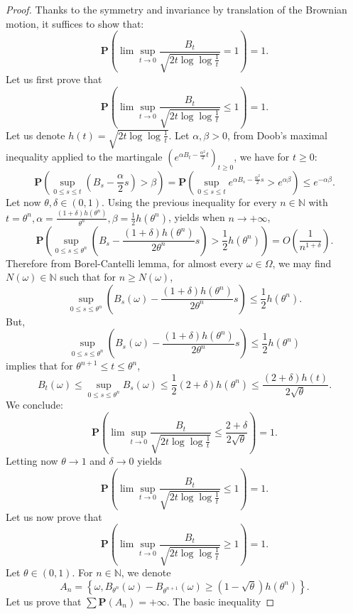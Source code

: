 \documentclass[twoside, 12pt]{book}
\numberwithin{equation}{chapter}
\def\bP{{\mathbf P}}
\def\ge{\geqslant}
\def\le{\leqslant}
\begin{document}
	\begin{proof}
		Thanks to the symmetry and invariance by translation of the Brownian motion, it suffices to show that:
		$$
		\bP \left( \lim \sup_{t \rightarrow 0} \frac{B_{t}}{\sqrt{2t\log  \log  \frac{1}{t}}} =1 \right)=1.  
		$$
		Let us first prove that 
		$$
		\bP \left( \lim \sup_{t \rightarrow 0} \frac{B_{t}}{\sqrt{2t \log  \log  \frac{1}{t}}} \le 1 \right)=1.  
		$$
		Let us denote $h(t)=\sqrt{2t \log  \log  \frac{1}{t}}$.   Let $\alpha, \beta >0$, from Doob’s maximal inequality applied to the martingale $\left(e^{\alpha B_t-\frac{\alpha^2}{2}t} \right)_{t \ge 0}$, we have for $t \ge 0$:
		\[
		\bP  \left(  \sup_{0 \le s \le t} \left( B_s-\frac{\alpha}{2}s\right)>\beta \right)=\bP  \left(  \sup_{0 \le s \le t} e^{\alpha B_s -\frac{\alpha^2}{2}s} >e^{\alpha \beta}\right) \le e^{-\alpha \beta}.
		\]
		Let now $\theta , \delta \in (0,1)$. Using the previous inequality for every $n \in \mathbb{N}$ with $t=\theta^n, \alpha=\frac{(1+\delta)h(\theta^n)}{\theta^n}, \beta=\frac{1}{2} h (\theta^n)$,  yields when $n \rightarrow +\infty$,
		$$
		\bP  \left(  \sup_{0 \le s \le \theta^n} \left( B_s -\frac{(1+\delta)h(\theta^n)}{2\theta^n}s\right)>\frac{1}{2} h (\theta^n) \right)=O\left( \frac{1}{n^{1+\delta}} \right).  
		$$
		Therefore from Borel-Cantelli lemma, for almost every $\omega \in \Omega$, we may find $N(\omega)\in \mathbb{N}$ such that for $n \ge N(\omega)$,
		$$
		\sup_{0 \le s \le \theta^n} \left( B_s(\omega)-\frac{(1+\delta)h(\theta^n)}{2\theta^n} s\right) \le \frac{1}{2}h (\theta^n).  
		$$
		But,
		$$
		\sup_{0 \le s \le \theta^n} \left( B_s(\omega) -\frac{(1+\delta)h(\theta^n)}{2\theta^n} s\right) \le \frac{1}{2} h (\theta^n)  
		$$
		implies that for $\theta^{n+1} \le t\le \theta^n$,
		$$
		B_t (\omega) \le \sup_{0 \le s \le \theta^n} B_s(\omega) \le \frac{1}{2} (2+\delta)h (\theta^n) \le \frac{(2+\delta)h(t)}{2\sqrt{\theta}}.  
		$$
		We conclude:
		$$
		\bP \left( \lim \sup_{t \rightarrow 0} \frac{B_{t}}{\sqrt{2t\log  \log  \frac{1}{t}}} \le \frac{2+\delta}{2\sqrt{\theta}}\right)=1.  
		$$
		Letting now $\theta \rightarrow 1$ and $\delta \rightarrow 0$ yields
		$$
		\bP \left( \lim \sup_{t \rightarrow 0} \frac{B_{t}}{\sqrt{2t \log  \log  \frac{1}{t}}} \le 1\right)=1.  
		$$
		Let us now prove that
		$$
		\bP \left( \lim \sup_{t \rightarrow 0} \frac{B_{t}}{\sqrt{2t\log  \log  \frac{1}{t}}} \ge 1 \right)=1.  
		$$
		Let $\theta \in (0,1)$. For $n \in \mathbb{N}$, we denote
		$$
		A_n=\left\{ \omega, B_{\theta^n}(\omega)-B_{\theta^{n+1}}(\omega) \ge (1-\sqrt{\theta})h(\theta^n)\right\}.  
		$$
		Let us prove that $\sum \bP  (A_n)=+\infty$.  The basic inequality

\end{proof}
\end{document}
